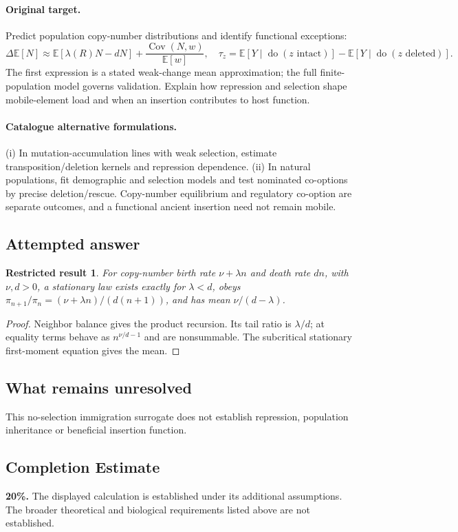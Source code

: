 \documentclass[11pt]{article}
\newcommand{\E}{\mathbb E}
\DeclareMathOperator{\Cov}{Cov}
\providecommand{\E}{\mathbb E}
\providecommand{\Cov}{\operatorname{Cov}}
\newtheorem{attemptresult}{Restricted result}[section]
\begin{document}
\paragraph{Original target.}
Predict population copy-number distributions and identify functional exceptions:
\[
\Delta\E[N]\approx\E[\lambda(R)N-dN]+\frac{\Cov(N,w)}{\E[w]},
\quad \tau_z=\E[Y\mid\operatorname{do}(z\text{ intact})]-\E[Y\mid\operatorname{do}(z\text{ deleted})].
\]
The first expression is a stated weak-change mean approximation; the full finite-population model governs validation. Explain how repression and selection shape mobile-element load and when an insertion contributes to host function.
\paragraph{Catalogue alternative formulations.}
(i) In mutation-accumulation lines with weak selection, estimate transposition/deletion kernels and repression dependence. (ii) In natural populations, fit demographic and selection models and test nominated co-options by precise deletion/rescue. Copy-number equilibrium and regulatory co-option are separate outcomes, and a functional ancient insertion need not remain mobile.
\subsection{Attempted answer}
\begin{attemptresult}
For copy-number birth rate $\nu+\lambda n$ and death rate $dn$, with $\nu,d>0$, a stationary law exists exactly for $\lambda<d$, obeys $\pi_{n+1}/\pi_n=(\nu+\lambda n)/(d(n+1))$, and has mean $\nu/(d-\lambda)$.
\end{attemptresult}
\begin{proof}
Neighbor balance gives the product recursion. Its tail ratio is $\lambda/d$; at equality terms behave as $n^{\nu/d-1}$ and are nonsummable. The subcritical stationary first-moment equation gives the mean.
\end{proof}
\subsection{What remains unresolved}
This no-selection immigration surrogate does not establish repression, population inheritance or beneficial insertion function.
\subsection{Completion Estimate}
\textbf{20\%.} The displayed calculation is established under its additional assumptions. The broader theoretical and biological requirements listed above are not established.
\end{document}
